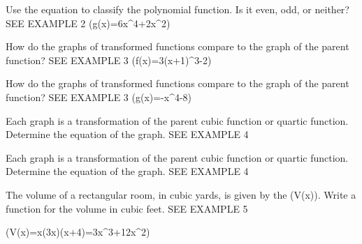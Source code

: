 \documentclass{article}
\newenvironment{practice}[2]{}{}        %
\newcommand{\answer}[1]{}               %
\newcommand{\placeholder}[2]{}          %
\newcommand{\te}[1]{}                   %
\begin{document}
\begin{practice}{16}{1}
Use the equation to classify the polynomial function. Is it even, odd, or neither? SEE EXAMPLE 2
(g(x)=6x^4+2x^2)
\answer{even}
\end{practice}
\begin{practice}{17}{1}
How do the graphs of transformed functions compare to the graph of the parent function? SEE EXAMPLE 3
(f(x)=3(x+1)^3-2)
\placeholder{graph}{Red increasing cubic through marked (-1,-2), y-intercept1; x,y window -4 to4 with unit grid labeled -2,2,O; arrows lower left/upper right.}
\answer{parent function: (y=x^3); Adding 1 (before calculating the cube) shifts the graph to the left 1 unit; multiplying by 3 stretches the translated graph vertically; subtracting 2 shifts the graph down 2 units.}
\end{practice}
\begin{practice}{18}{1}
How do the graphs of transformed functions compare to the graph of the parent function? SEE EXAMPLE 3
(g(x)=-x^4-8)
\placeholder{graph}{Red downward quartic below x-axis with solid vertex (0,-8), ends point down. x window -5 to3 unit grid labeled -4,-2,2; y -10 to6 grid2 labeled -4,4; O, axes x,y.}
\answer{parent function: (y=x^4); The leading coefficient of (-1) reflects the graph across the (x)-axis; subtracting 8 shifts the graph down 8 units.}
\end{practice}
\begin{practice}{19}{1}
Each graph is a transformation of the parent cubic function or quartic function. Determine the equation of the graph. SEE EXAMPLE 4
\placeholder{graph}{Red descending cubic centered at solid (1,0), crossing y at1, arrows upper left/lower right. x,y window -4 to4, unit grid, labels -2,2,O; axes x,y.}
\answer{(f(x)=-(x-1)^3)}
\end{practice}
\begin{practice}{20}{1}
Each graph is a transformation of the parent cubic function or quartic function. Determine the equation of the graph. SEE EXAMPLE 4
\placeholder{graph}{Red upward quartic with solid vertex (5,10), ends point up; x window -4 to12, grid2, labels4,8; y -10 to30, grid5, labels10,20; O, axes x,y.}
\answer{(f(x)=(x-5)^4+10)}
\end{practice}
\begin{practice}{21}{2}
The volume of a rectangular room, in cubic yards, is given by the (V(x)). Write a function for the volume in cubic feet. SEE EXAMPLE 5
\placeholder{illustration}{Bedroom with yellow bunk bed, desk, chair, plant and window; callout V(x)=x(3x)(x+4)=3x cubed+12x squared.}
(V(x)=x(3x)(x+4)=3x^3+12x^2)
\answer{(V(x)=81x^3+108x^2)}
\te{Printed answer substitutes 3x into the original polynomial. A unit conversion of the full volume with x still in yards would multiply both coefficients by 27.}
\end{practice}
\end{document}
